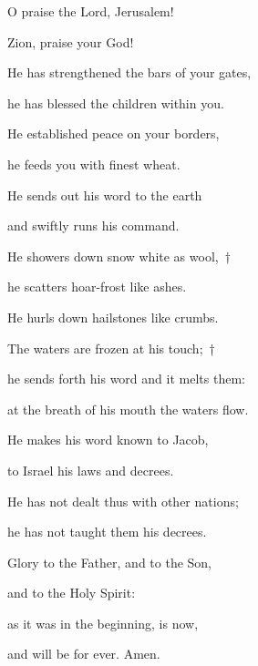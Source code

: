 \noindent O praise the Lord, Jerusalem!~\GreStar{}~\nopagebreak

Zion, praise your God!

\noindent He has strengthened the bars of your gates,~\GreStar{}~\nopagebreak

he has blessed the children within you.

\noindent He established peace on your borders,~\GreStar{}~\nopagebreak

he feeds you with finest wheat.

\noindent He sends out his word to the earth~\GreStar{}~\nopagebreak

and swiftly runs his command.

\noindent He showers down snow white as wool,~†~\nopagebreak

he scatters hoar-frost like ashes.~\GreStar{}~\nopagebreak

He hurls down hailstones like crumbs.

\noindent The waters are frozen at his touch;~†~\nopagebreak

he sends forth his word and it melts them:~\GreStar{}~\nopagebreak

at the breath of his mouth the waters flow.

\noindent He makes his word known to Jacob,~\GreStar{}~\nopagebreak

to Israel his laws and decrees.

\noindent He has not dealt thus with other nations;~\GreStar{}~\nopagebreak

he has not taught them his decrees.

\noindent Glory to the Father, and to the Son,~\GreStar{}~\nopagebreak

and to the Holy Spirit:

\noindent as it was in the beginning, is now,~\GreStar{}~\nopagebreak

and will be for ever. Amen.
